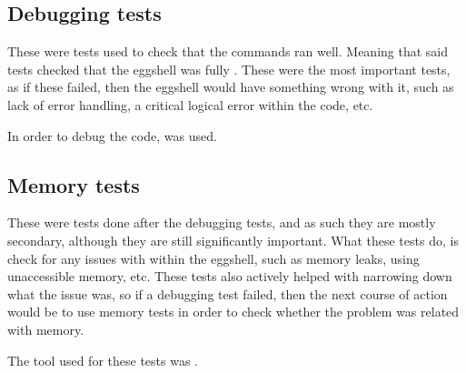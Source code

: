 \documentclass[12pt, a4paper]{report}
\begin{document}
            \subsection{Debugging tests}
                These were tests used to check that the commands ran well.
                Meaning that said tests checked that the eggshell was fully
                . These were the most important tests, as if
                these failed, then the eggshell would have something wrong 
                with it, such as lack of error handling, a critical logical
                error within the code, etc.

                In order to debug the code,  was used.

            \subsection{Memory tests}
                These were tests done after the debugging tests, and as such
                they are mostly secondary, although they are still significantly
                important. What these tests do, is check for any issues with 
                 within the eggshell, such as memory leaks, using 
                unaccessible memory, etc. These tests also actively helped with
                narrowing down what the issue was, so if a debugging test failed,
                then the next course of action would be to use memory tests in 
                order to check whether the problem was related with memory.

                The tool used for these tests was .

            \clearpage
\end{document}
